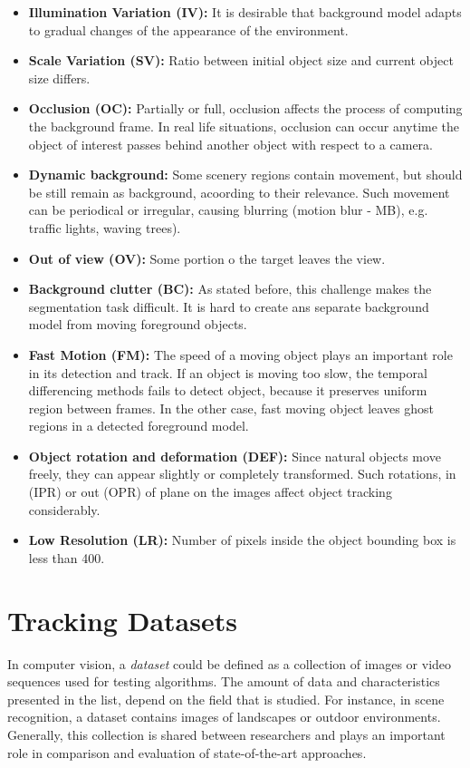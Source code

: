 \begin{itemize}
\item \textbf{Illumination Variation (IV):} It is desirable that background model adapts to gradual changes of the appearance of the environment.
\item \textbf{Scale Variation (SV):} Ratio between initial object size and current object size differs.
\item \textbf{Occlusion (OC):} Partially or full, occlusion affects the process of computing the background frame. In real life situations, occlusion can occur anytime the object of interest passes behind another object with respect to a camera.
\item \textbf{Dynamic background:} Some scenery regions contain movement, but should be still remain as background, acoording to their relevance. Such movement can be periodical or irregular, causing blurring (motion blur - MB), e.g. traffic lights, waving trees).
\item \textbf{Out of view (OV): } Some portion o the target leaves the view.
\item \textbf{Background clutter (BC):} As stated before, this challenge makes the segmentation task difficult. It is hard to create ans separate background model from moving foreground objects.
\item \textbf{Fast Motion (FM):} The speed of a moving object plays an important role in its detection and track. If an object is moving too slow, the temporal differencing methods fails to detect object, because it preserves uniform region between frames. In the other case, fast moving object leaves ghost regions in a detected foreground model.
\item \textbf{Object rotation and deformation (DEF):} Since natural objects move freely, they can appear slightly or completely transformed. Such rotations, in (IPR) or out (OPR) of plane on the images affect object tracking considerably.
\item \textbf{Low Resolution (LR):} Number of pixels inside the object bounding box is less than 400.
\end{itemize}

\section{Tracking Datasets}

In computer vision, a \textit{dataset} could be defined as a collection of images or video sequences used for testing algorithms. The amount of data and characteristics presented in the list, depend on the field that is studied. For instance, in scene recognition, a dataset contains images of landscapes or outdoor environments. Generally, this collection is shared between researchers and plays an important role in comparison and evaluation of state-of-the-art approaches.

